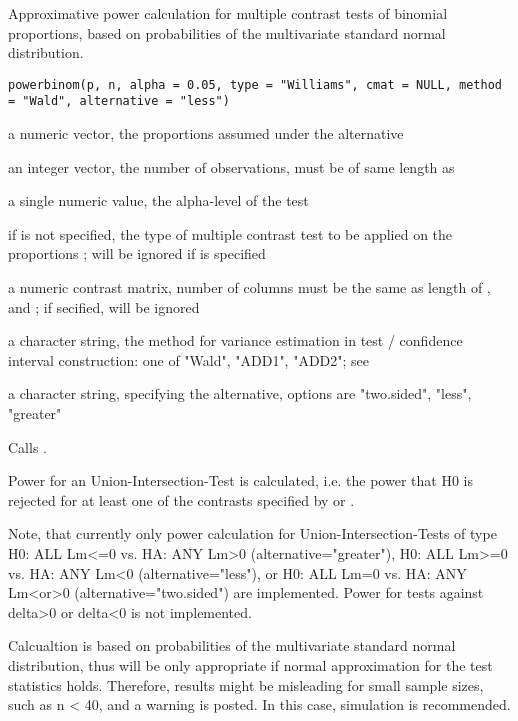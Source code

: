 \begin{Description}\relax
Approximative power calculation for multiple contrast tests of binomial proportions, based on probabilities of the multivariate standard normal distribution.
\end{Description}
\begin{Usage}
\begin{verbatim}
powerbinom(p, n, alpha = 0.05, type = "Williams", cmat = NULL, method = "Wald", alternative = "less")
\end{verbatim}
\end{Usage}
\begin{Arguments}
\begin{ldescription}
\item[\code{p}] a numeric vector, the proportions assumed under the alternative 
\item[\code{n}] an integer vector, the number of observations, must be of same length as  
\item[\code{alpha}] a single numeric value, the alpha-level of the test  
\item[\code{type}] if  is not specified, the type of multiple contrast test to be applied on the proportions ; will be ignored if  is specified
\item[\code{cmat}] a numeric contrast matrix, number of columns must be the same as length of , and ; if secified,  will be ignored 
\item[\code{method}] a character string, the method for variance estimation in test / confidence interval construction: one of "Wald", "ADD1", "ADD2"; see  
\item[\code{alternative}] a character string, specifying the alternative, options are "two.sided", "less", "greater" 
\end{ldescription}
\end{Arguments}
\begin{Details}\relax
Calls . 

Power for an Union-Intersection-Test is calculated, i.e. the power that H0 is rejected for at least one of the contrasts specified by  or .

Note, that currently only power calculation for Union-Intersection-Tests of 
type H0: ALL Lm<=0 vs.  HA: ANY Lm>0 (alternative="greater"), H0: ALL Lm>=0 vs.  HA: ANY Lm<0 (alternative="less"), or H0: ALL Lm=0 vs.  HA: ANY Lm<or>0 (alternative="two.sided") are implemented.
Power for tests against delta>0 or delta<0 is not implemented.

Calcualtion is based on probabilities of the multivariate standard normal distribution, thus will be only appropriate if normal approximation for the test statistics holds.
Therefore, results might be misleading for small sample sizes, such as n < 40, and a warning is posted. In this case, simulation is recommended.
\end{Details}
